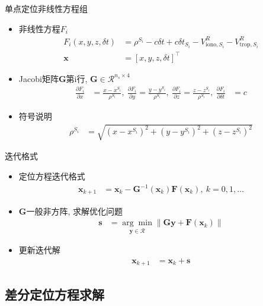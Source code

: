 \begin{frame}{单点定位非线性方程组}
    \begin{itemize}
        \item 非线性方程$F _ i$
        \begin{align*}
            F _ i \left( x, y, z, \delta t \right) &= \rho ^ { S _ i } - c \delta t
            + c \delta t _ { S _ i } - V _ { \mathrm{ iono }, S _ i } ^ R - V _ { \mathrm{ trop }, S _ i } ^ R \\
            \mathbf x &= \left[ x, y, z, \delta t \right] ^ \top
        \end{align*}
        \item Jacobi矩阵$\mathbf G$第i行, $\mathbf G \in \mathcal R ^ { n _ s \times 4 }$
        \begin{align*}
            \frac{ \partial F _ i }{ \partial x } &= \frac{ x - x ^ { S _ i } }{ \rho ^ { S _ i } }, \
            \frac{ \partial F _ i }{ \partial y } = \frac{ y - y ^ { S _ i } }{ \rho ^ { S _ i } }, \
            \frac{ \partial F _ i }{ \partial z } = \frac{ z - z ^ { S _ i } }{ \rho ^ { S _ i } }, \
            \frac{ \partial F _ i }{ \partial \delta t } &= c
        \end{align*}
        \item 符号说明
        \begin{align*}
            \rho ^ { S _ i } &= \sqrt{ \left( x - x ^ { S _ i } \right) ^ 2
            + \left( y - y ^ { S _ i } \right) ^ 2 + \left( z - z ^ { S _ i } \right) ^ 2 }
        \end{align*}
    \end{itemize}
\end{frame}

\begin{frame}{迭代格式}
    \begin{itemize}
        \item 定位方程迭代格式
        \begin{align*}
            \mathbf x _ { k + 1 } &= \mathbf x _ k - \mathbf G ^ { -1 } \left( \mathbf x _ k \right)
            \mathbf F \left( \mathbf x _ k \right), \ k = 0, 1, \ldots
        \end{align*}
        \item $\mathbf G$一般非方阵, 求解优化问题
        \begin{align*}
            \mathbf s &= \underset{ \mathbf y \in \mathcal R }{ \arg \min }
            \left\| \mathbf G \mathbf y  + \mathbf F \left( \mathbf x _ k \right) \right\|
        \end{align*}
        \item 更新迭代解
        \begin{align*}
            \mathbf x _ { k + 1 } &= \mathbf x _ k + \mathbf s
        \end{align*}
    \end{itemize}
\end{frame}

\subsection{差分定位方程求解}
